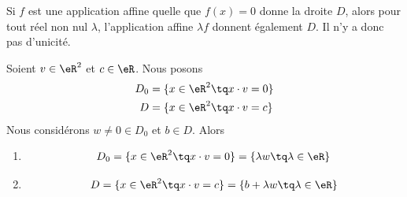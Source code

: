 Si \( f\) est une application affine quelle que \( f(x)=0\) donne la droite \( D\), alors pour tout réel non nul \( \lambda\), l'application affine \( \lambda f\)  donnent également \( D\). Il n'y a donc pas d'unicité.

\begin{proposition}	\label{PROPooTIIUooNtbQLz}
	Soient \( v\in \eR^2\) et \( c\in \eR\). Nous posons
	\begin{subequations}
		\begin{align}
			D_0 & =\{ x\in \eR^2\tq x\cdot v=0 \} \\
			D   & =\{ x\in \eR^2\tq x\cdot v=c \}
		\end{align}
	\end{subequations}
	Nous considérons \( w\neq 0\in D_0\) et \( b\in D\). Alors
	\begin{enumerate}
		\item		\label{ITEMooSTSZooKMQImS}
		      \begin{equation}
			      D_0=\{ x\in \eR^2\tq x\cdot v=0 \}=\{ \lambda w\tq \lambda\in \eR \}
		      \end{equation}
		\item		\label{ITEMooWNRSooLcCikX}
		      \begin{equation}
			      D=\{ x\in \eR^2\tq x\cdot v=c \}=\{ b+\lambda w\tq \lambda\in \eR \}
		      \end{equation}
	\end{enumerate}
\end{proposition}

